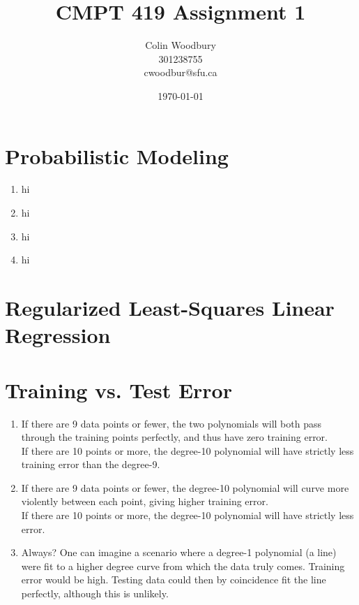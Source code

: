 \documentclass{article}
\begin{document}
\title{CMPT 419 Assignment 1}
\author{Colin Woodbury\\ 301238755\\ cwoodbur@sfu.ca}
\date{\today}
\maketitle

\tableofcontents
\clearpage

\section{Probabilistic Modeling}

\begin{enumerate}
\item hi
\item hi
\item hi
\item hi
\end{enumerate}

\section{Regularized Least-Squares Linear Regression}

\section{Training vs. Test Error}
\begin{enumerate}
\item {} If there are 9 data points or fewer, the two polynomials
will   both pass through the training points perfectly, and thus have zero  
training error.\\   If there are 10 points or more, the degree-10 polynomial
will have strictly   less training error than the degree-9.
\item {} If there are 9 data points or fewer, the degree-10 polynomial
  will curve more violently between each point, giving higher training
  error.\\
  If there are 10 points or more, the degree-10 polynomial will have
  strictly less error.
\item Always?  One can imagine a scenario where a degree-1
  polynomial (a line) were fit to a higher degree curve from which the data
  truly comes. Training error would be high.
  Testing data could then by coincidence fit the line perfectly, although
  this is unlikely.
\end{enumerate}
\end{document}
